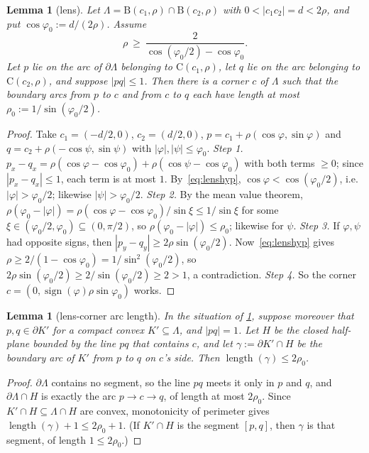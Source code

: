 \documentclass[11pt]{amsart}
\newtheorem{lemma}[theorem]{Lemma}
\theoremstyle{definition}
\theoremstyle{remark}
\newcommand{\Cc}{\mathrm{C}}      %
\newcommand{\Dd}{\mathrm{B}}      %
\begin{document}
\begin{lemma}[lens]\label{lem:lens}
Let $\Lambda=\Dd(c_1,\rho)\cap\Dd(c_2,\rho)$ with $0<|c_1c_2|=d<2\rho$, and put $\cos\varphi_0:=d/(2\rho)$. Assume
\begin{equation}\label{eq:lenshyp}
\rho\ \ge\ \frac{2}{\cos(\varphi_0/2)-\cos\varphi_0}.
\end{equation}
Let $p$ lie on the arc of $\partial\Lambda$ belonging to $\Cc(c_1,\rho)$, let $q$ lie on the arc belonging to $\Cc(c_2,\rho)$, and suppose $|pq|\le 1$. Then there is a corner $c$ of $\Lambda$ such that the boundary arcs from $p$ to $c$ and from $c$ to $q$ each have length at most $\rho_0:=1/\sin(\varphi_0/2)$.
\end{lemma}
\begin{proof}
Take $c_1=(-d/2,0)$, $c_2=(d/2,0)$, $p=c_1+\rho(\cos\varphi,\sin\varphi)$ and $q=c_2+\rho(-\cos\psi,\sin\psi)$ with $|\varphi|,|\psi|\le\varphi_0$.
\emph{Step 1.} $p_x-q_x=\rho(\cos\varphi-\cos\varphi_0)+\rho(\cos\psi-\cos\varphi_0)$ with both terms $\ge0$; since $|p_x-q_x|\le1$, each term is at most $1$. By~\eqref{eq:lenshyp}, $\cos\varphi<\cos(\varphi_0/2)$, i.e.\ $|\varphi|>\varphi_0/2$; likewise $|\psi|>\varphi_0/2$.
\emph{Step 2.} By the mean value theorem, $\rho(\varphi_0-|\varphi|)=\rho(\cos\varphi-\cos\varphi_0)/\sin\xi\le 1/\sin\xi$ for some $\xi\in(\varphi_0/2,\varphi_0)\subseteq(0,\pi/2)$, so $\rho(\varphi_0-|\varphi|)\le\rho_0$; likewise for $\psi$.
\emph{Step 3.} If $\varphi,\psi$ had opposite signs, then $|p_y-q_y|\ge 2\rho\sin(\varphi_0/2)$. Now~\eqref{eq:lenshyp} gives $\rho\ge 2/(1-\cos\varphi_0)=1/\sin^2(\varphi_0/2)$, so $2\rho\sin(\varphi_0/2)\ge 2/\sin(\varphi_0/2)\ge2>1$, a contradiction.
\emph{Step 4.} So the corner $c=(0,\operatorname{sign}(\varphi)\rho\sin\varphi_0)$ works.
\end{proof}

\begin{lemma}[lens-corner arc length]\label{lem:lenscorner}
In the situation of \cref{lem:lens}, suppose moreover that $p,q\in\partial K'$ for a compact convex $K'\subseteq\Lambda$, and $|pq|=1$. Let $H$ be the closed half-plane bounded by the line $pq$ that contains $c$, and let $\gamma:=\partial K'\cap H$ be the boundary arc of $K'$ from $p$ to $q$ on $c$'s side. Then $\operatorname{length}(\gamma)\le 2\rho_0$.
\end{lemma}
\begin{proof}
$\partial\Lambda$ contains no segment, so the line $pq$ meets it only in $p$ and $q$, and $\partial\Lambda\cap H$ is exactly the arc $p\to c\to q$, of length at most $2\rho_0$. Since $K'\cap H\subseteq\Lambda\cap H$ are convex, monotonicity of perimeter gives $\operatorname{length}(\gamma)+1\le 2\rho_0+1$. (If $K'\cap H$ is the segment $[p,q]$, then $\gamma$ is that segment, of length $1\le2\rho_0$.)
\end{proof}
\end{document}
